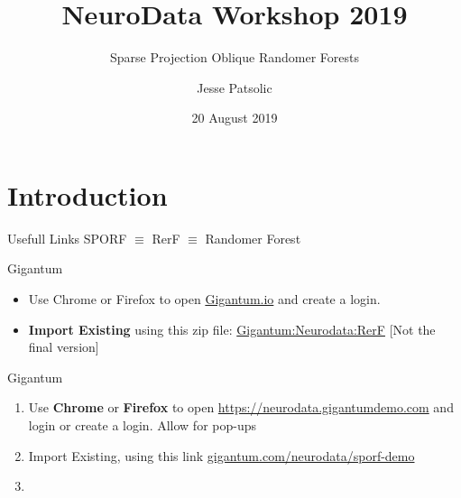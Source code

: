 \documentclass[xcolor=dvipsnames]{beamer}
\title[NDWS-2019]{NeuroData Workshop 2019}
\subtitle[SPORF]{Sparse Projection Oblique Randomer Forests}
\author[JLP]{Jesse Patsolic}
\institute[JHU]{Johns Hopkins University}%
\date[20190820]{20 August 2019}
\begin{document}
\begin{frame}
\titlepage
\end{frame}



\section{Introduction}

\begin{frame}{Usefull Links}
    \Large
    SPORF $\equiv$ RerF $\equiv$ Randomer Forest
\end{frame}

\begin{frame}{Gigantum}
    \begin{itemize}
        \item Use Chrome or Firefox to open \href{https://rerf.gigantumdemo.com}{Gigantum.io} and create a login.
        \item \textbf{Import Existing} using this zip file:
            \href{http://cis.jhu.edu/~jesse/gigantum/rerf-9f82cd.zip}{Gigantum:Neurodata:RerF}
            [Not the final version]
    \end{itemize}
\end{frame}

\begin{frame}{Gigantum}
    \begin{enumerate}
        \item Use {\bfseries Chrome} or {\bfseries Firefox} to open %
            \href{https://neurodata.gigantumdemo.com}{https://neurodata.gigantumdemo.com} %
            and login or create a login.  Allow for pop-ups
        \item Import Existing, using this link
            \href{gigantum.com/neurodata/sporf-demo}%
            {gigantum.com/neurodata/sporf-demo}%
        \item 
    \end{enumerate}
\end{frame}
\end{document}
